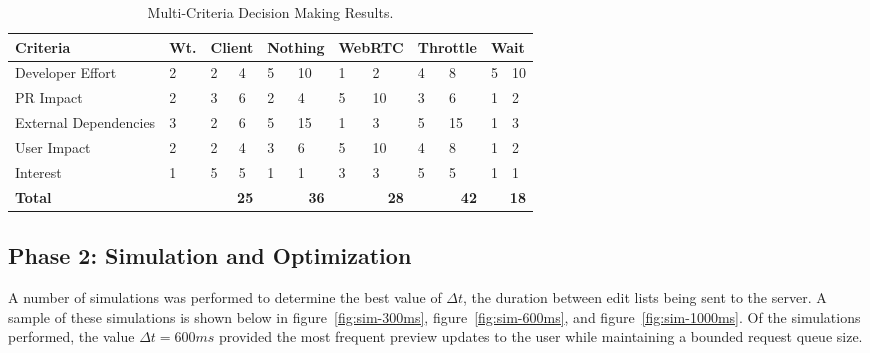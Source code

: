 \documentclass[se]{uw-wkrpt}
\begin{document}
\begin{table}
  \caption{Multi-Criteria Decision Making Results.}
  \label{tbl:mcdm}
  \centering
  \begin{tabular}{|p{3.0cm}|p{0.75cm}|
                   p{0.75cm}|p{0.75cm}|p{0.75cm}|p{0.75cm}|p{0.75cm}|
                   p{0.75cm}|p{0.75cm}|p{0.75cm}|p{0.75cm}|p{0.75cm}|}
    \hline
    \textbf{Criteria} &
    \textbf{Wt.} &
    \multicolumn{2}{|p{1.50cm}|}{\textbf{Client}} &
    \multicolumn{2}{|p{1.50cm}|}{\textbf{Nothing}} &
    \multicolumn{2}{|p{1.50cm}|}{\textbf{WebRTC}} &
    \multicolumn{2}{|p{1.50cm}|}{\textbf{Throttle}} &
    \multicolumn{2}{|p{1.50cm}|}{\textbf{Wait}} \\
    \hline
    \hline
    Developer Effort &
       2 &  2 &  4 &  5 & 10 &  1 &  2 &  4 &  8 &  5 & 10 \\
    \hline
    PR Impact &
       2 &  3 &  6 &  2 &  4 &  5 & 10 &  3 &  6 &  1 &  2 \\
    \hline
    External Dependencies &
       3 &  2 &  6 &  5 & 15 &  1 &  3 &  5 & 15 &  1 &  3 \\
    \hline
    User Impact &
       2 &  2 &  4 &  3 &  6 &  5 & 10 &  4 &  8 &  1 &  2 \\
    \hline
    Interest &
       1 &  5 &  5 &  1 &  1 &  3 &  3 &  5 &  5 &  1 &  1 \\
    \hline
    \hline
    \textbf{Total} &
      &
      \multicolumn{2}{|r|}{\textbf{25}} &
      \multicolumn{2}{|r|}{\textbf{36}} &
      \multicolumn{2}{|r|}{\textbf{28}} &
      \multicolumn{2}{|r|}{\textbf{42}} &
      \multicolumn{2}{|r|}{\textbf{18}} \\
    \hline
  \end{tabular}
\end{table}

\subsection{Phase 2: Simulation and Optimization}
A number of simulations was performed to determine the best value of
$\Delta t$, the duration between edit lists being sent to the server. A
sample of these simulations is shown below in figure~\ref{fig:sim-300ms},
figure~\ref{fig:sim-600ms}, and figure~\ref{fig:sim-1000ms}. Of the
simulations performed, the value $\Delta t=600 ms$ provided the most
frequent preview updates to the user while maintaining a bounded request
queue size.
\end{document}
